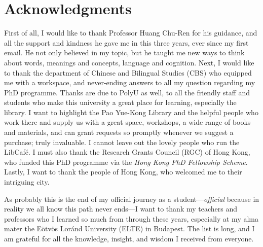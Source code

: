 \chapter*{Acknowledgments}
\label{ch:acknowledgments}


First of all, I would like to thank Professor Huang Chu-Ren for his guidance, and all the support and kindness he gave me in this three years, ever since my first email. He not only believed in my topic, but he taught me new ways to think about words, meanings and concepts, language and cognition. Next, I would like to thank the department of Chinese and Bilingual Studies (CBS) who equipped me with a workspace, and never-ending answers to all my question regarding my PhD programme. Thanks are due to PolyU as well, to all the friendly staff and students who make this university a great place for learning, especially the library. I want to highlight the Pao Yue-Kong Library and the helpful people who work there and supply us with a great space, workshops, a wide range of books and materials, and can grant requests so promptly whenever we suggest a purchase; truly invaluable. I cannot leave out the lovely people who run the LibCafé. I must also thank the Research Grants Council (RGC) of Hong Kong, who funded this PhD programme via the \textit{Hong Kong PhD Fellowship Scheme}. Lastly, I want to thank the people of Hong Kong, who welcomed me to their intriguing city.




As probably this is the end of my official journey as a student---\textit{official} because in reality we all know this path never ends---I want to thank my teachers and professors who I learned so much from through these years, especially at my alma mater the Eötvös Loránd University (ELTE) in Budapest. The list is long, and I am grateful for all the knowledge, insight, and wisdom I received from everyone.


